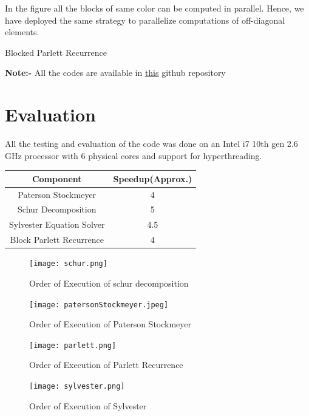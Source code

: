 \documentclass[12pt,a4paper]{article}
\begin{document}
In the figure all the blocks of same color can be computed in parallel. Hence, we have deployed the same strategy to parallelize computations of off-diagonal elements. 

\begin{algorithm}
\caption{Blocked Parlett Recurrence}\label{euclid}
\begin{algorithmic}[1]
    \EndFor
\EndFor
\end{algorithmic}
\end{algorithm}
\textbf{Note:-} All the codes are available in  \href{https://github.com/ChakPC/Matrix_Polynomial_Parallelization}{\underline{this}}  github repository
\newpage
\section{Evaluation}
All the testing and evaluation of the code was done on an Intel i7 10th gen 2.6 GHz processor with 6 physical cores and support for hyperthreading. \\



\begin{center}
\begin{tabular}{|c|c|} 
 \hline
 \textbf{Component} & \textbf{Speedup(Approx.)} \\ [0.5ex] 
 \hline
 Paterson Stockmeyer & 4 \\ 
 \hline
 Schur Decomposition & 5\\
 \hline
 Sylvester Equation Solver & 4.5 \\
 \hline
 Block Parlett Recurrence & 4\\
 \hline
\end{tabular}
\end{center}

\begin{center}
\begin{figure}[H]
    \centering
    \texttt{[image: schur.png]}
    \caption{Order of Execution of schur decomposition}
\end{figure}
\begin{figure}[H]
    \centering
    \texttt{[image: patersonStockmeyer.jpeg]}
    \caption{Order of Execution of Paterson Stockmeyer}
\end{figure}


\begin{figure}[H]
    \centering
    \texttt{[image: parlett.png]}
    \caption{Order of Execution of Parlett Recurrence}
\end{figure}


\begin{figure}[H]
    \centering
    \texttt{[image: sylvester.png]}
    \caption{Order of Execution of Sylvester}
\end{figure}
\end{center}
\end{document}

